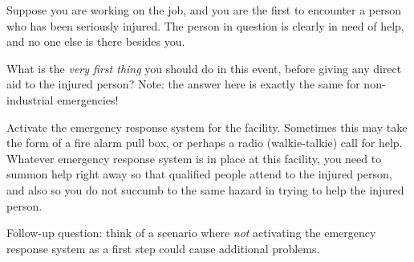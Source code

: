 

Suppose you are working on the job, and you are the first to encounter a person who has been seriously injured.  The person in question is clearly in need of help, and no one else is there besides you.

\vskip 10pt

What is the {\it very first thing} you should do in this event, before giving any direct aid to the injured person?  Note: the answer here is exactly the same for non-industrial emergencies!







Activate the emergency response system for the facility.  Sometimes this may take the form of a fire alarm pull box, or perhaps a radio (walkie-talkie) call for help.  Whatever emergency response system is in place at this facility, you need to summon help right away so that qualified people attend to the injured person, and also so you do not succumb to the same hazard in trying to help the injured person.

\vskip 10pt

Follow-up question: think of a scenario where {\it not} activating the emergency response system as a first step could cause additional problems.











